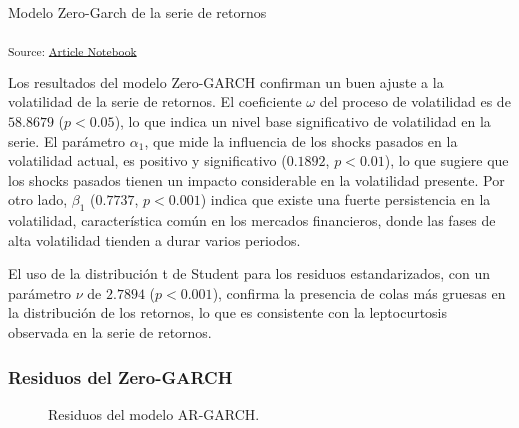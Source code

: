 \documentclass[
  number,
  preprint,
  3p,
  onecolumn]{elsarticle}
\begin{document}
Modelo Zero-Garch de la serie de retornos

\textsubscript{Source:
\href{https://iancont.github.io/fixed_income_garch/index.qmd.html}{Article
Notebook}}

Los resultados del modelo Zero-GARCH confirman un buen ajuste a la
volatilidad de la serie de retornos. El coeficiente \(\omega\) del
proceso de volatilidad es de \(58.8679\) (\(p < 0.05\)), lo que indica
un nivel base significativo de volatilidad en la serie. El parámetro
\(\alpha_1\), que mide la influencia de los shocks pasados en la
volatilidad actual, es positivo y significativo (\(0.1892\),
\(p < 0.01\)), lo que sugiere que los shocks pasados tienen un impacto
considerable en la volatilidad presente. Por otro lado, \(\beta_1\)
(\(0.7737\), \(p < 0.001\)) indica que existe una fuerte persistencia en
la volatilidad, característica común en los mercados financieros, donde
las fases de alta volatilidad tienden a durar varios periodos.

El uso de la distribución t de Student para los residuos estandarizados,
con un parámetro \(\nu\) de \(2.7894\) (\(p < 0.001\)), confirma la
presencia de colas más gruesas en la distribución de los retornos, lo
que es consistente con la leptocurtosis observada en la serie de
retornos.

\subsubsection{Residuos del Zero-GARCH}\label{residuos-del-zero-garch}

\begin{figure}[H]


\caption{\label{fig-garch-residuals}Residuos del modelo AR-GARCH.}

\end{figure}%
\end{document}
